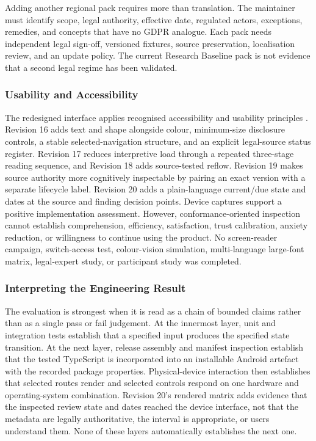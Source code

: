 Adding another regional pack requires more than translation. The maintainer must identify scope, legal authority, effective date, regulated actors, exceptions, remedies, and concepts that have no GDPR analogue. Each pack needs independent legal sign-off, versioned fixtures, source preservation, localisation review, and an update policy. The current Research Baseline pack is not evidence that a second legal regime has been validated.

\subsubsection{Usability and Accessibility}

The redesigned interface applies recognised accessibility and usability principles \cite{wcag22,androidaccess,iso924111}. Revision 16 adds text and shape alongside colour, minimum-size disclosure controls, a stable selected-navigation structure, and an explicit legal-source status register. Revision 17 reduces interpretive load through a repeated three-stage reading sequence, and Revision 18 adds source-tested reflow. Revision 19 makes source authority more cognitively inspectable by pairing an exact version with a separate lifecycle label. Revision 20 adds a plain-language current/due state and dates at the source and finding decision points. Device captures support a positive implementation assessment. However, conformance-oriented inspection cannot establish comprehension, efficiency, satisfaction, trust calibration, anxiety reduction, or willingness to continue using the product. No screen-reader campaign, switch-access test, colour-vision simulation, multi-language large-font matrix, legal-expert study, or participant study was completed.

\subsubsection{Interpreting the Engineering Result}

The evaluation is strongest when it is read as a chain of bounded claims rather than as a single pass or fail judgement. At the innermost layer, unit and integration tests establish that a specified input produces the specified state transition. At the next layer, release assembly and manifest inspection establish that the tested TypeScript is incorporated into an installable Android artefact with the recorded package properties. Physical-device interaction then establishes that selected routes render and selected controls respond on one hardware and operating-system combination. Revision 20's rendered matrix adds evidence that the inspected review state and dates reached the device interface, not that the metadata are legally authoritative, the interval is appropriate, or users understand them. None of these layers automatically establishes the next one.

